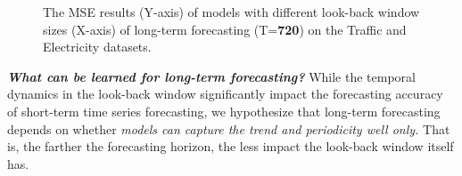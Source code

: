 \documentclass[10pt,twocolumn,letterpaper]{article}
\begin{document}
\begin{figure}[h]	
    \hspace{-0.6cm}
    \hspace{0.6cm}
    \vspace{-0.2cm}
	\caption{The MSE results (Y-axis) of models with different look-back window sizes (X-axis) of long-term forecasting (T=\textbf{720}) on the Traffic and Electricity datasets. } 
	\label{fig:lookBackWindows}  \vspace{-0.2cm}
\end{figure}

\textbf{\emph{What can be learned for long-term forecasting?}}
While the temporal dynamics in the look-back window significantly impact the forecasting accuracy of short-term time series forecasting, we hypothesize that long-term forecasting depends on whether \emph{models can capture the trend and periodicity well only.} That is, the farther the forecasting horizon, the less impact the look-back window itself has.  
\begin{table}[h]
\centering
{}
\vspace{-0.2cm}
\caption{Comparison of different input sequences under the MSE metric to explore what LTSF-Transformers depend on. If the input is \emph{Close}, we use the  time steps as the input sequence. If the input is \emph{Far}, we use the  time steps. Both of them forecast the  time steps. }
\label{tab:Prior}
\vspace{-0.4cm}
\end{table}
\end{document}
